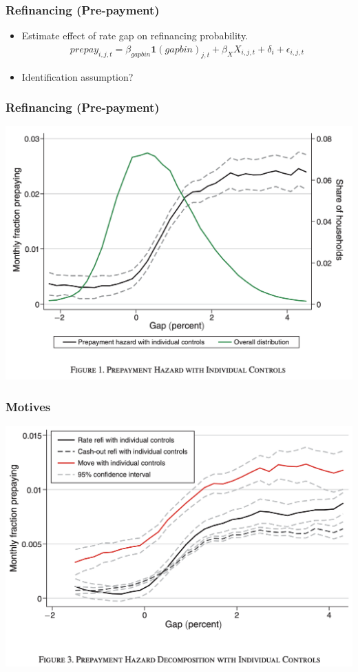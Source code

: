 \documentclass[english,xcolor=svgnames]{beamer}
\begin{document}
\begin{frame}
    \frametitle{Refinancing (Pre-payment)}
    \begin{itemize}
    	\item Estimate effect of rate gap on refinancing probability.
    	\begin{align*}
    	prepay_{i,j,t} = \beta_{gapbin} \bm{1}(gapbin)_{j,t} + \beta_X X_{i,j,t} + \delta_i + \epsilon_{i,j,t}
    \end{align*}
    \item Identification assumption?
    \end{itemize}
\end{frame}

\begin{frame}
    \frametitle{Refinancing (Pre-payment)}
    \begin{center}
    	\includegraphics[scale=0.3]{figures/BMTVFIG1.png}	
    \end{center}
\end{frame}

\begin{frame}
    \frametitle{Motives}
    \begin{center}
    	\includegraphics[scale=0.3]{figures/BMTVFIG3.png}	
    \end{center}
\end{frame}
\end{document}

